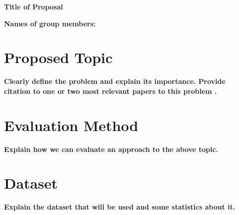 \documentclass[12pt]{article}
\begin{document}
\thispagestyle{empty}
	
\centerline{\textbf{\Large{Title of Proposal}}}
\bigskip
\noindent \textbf{Names of group members:}

\section*{Proposed Topic}
\textbf{Clearly define the problem and explain its importance. Provide citation to one or two most relevant papers to this problem \cite{Smith:2013jd}.} \lipsum[1]
	
\section*{Evaluation Method}
\textbf{Explain how we can evaluate an approach to the above topic.} \lipsum[1]
	
\section*{Dataset}
\textbf{Explain the dataset that will be used and some statistics about it.} \lipsum[1]
	



\end{document}
